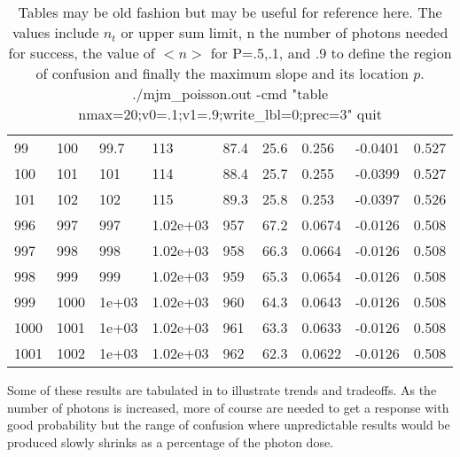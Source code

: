 \begin{table}[H]
\begin{tabular}{l|l|l|l|l|l|l|l|l|}
99&100&99.7&113&87.4&25.6&0.256&-0.0401&0.527 \\
100&101&101&114&88.4&25.7&0.255&-0.0399&0.527 \\
101&102&102&115&89.3&25.8&0.253&-0.0397&0.526 \\
\hline
996&997&997&1.02e+03&957&67.2&0.0674&-0.0126&0.508 \\
997&998&998&1.02e+03&958&66.3&0.0664&-0.0126&0.508 \\
998&999&999&1.02e+03&959&65.3&0.0654&-0.0126&0.508 \\
999&1000&1e+03&1.02e+03&960&64.3&0.0643&-0.0126&0.508 \\
1000&1001&1e+03&1.02e+03&961&63.3&0.0633&-0.0126&0.508 \\
1001&1002&1e+03&1.02e+03&962&62.3&0.0622&-0.0126&0.508 \\
\hline
\end{tabular}
\caption{Tables may be old fashion but may be useful for reference here.
The values include $n_t$ or upper sum limit, n the number of photons
needed for success, the value of $<n>$ for P=.5,.1, and .9 to define the
region of confusion and finally the maximum slope and its location $p$. 
./mjm\_poisson.out -cmd "table nmax=20;v0=.1;v1=.9;write\_lbl=0;prec=3" quit
}
\label{tab:sumpoints}
\end{table}

Some of these results are tabulated in  to illustrate
trends and tradeoffs. As the number of photons is increased, more of course 
are needed to get a response with good probability but the range
of confusion where unpredictable results would be produced slowly shrinks
as a percentage of the photon dose. 


